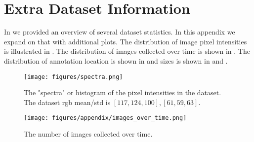 

\appendix

\section{Extra Dataset Information}

In  we provided an overview of several dataset statistics.
In this appendix we expand on that with additional plots.
The distribution of image pixel intensities is illustrated in .
The distribution of images collected over time is shown in .
The distribution of annotation location is shown in  and sizes is shown
  in  and .


\begin{figure}[ht]
\centering
\texttt{[image: figures/spectra.png]}
\caption[]{
    The "spectra" or histogram of the pixel intensities in the dataset. 
    The dataset rgb  mean/std is $[117, 124, 100], [61, 59, 63]$.
}
\label{fig:spectra}
\end{figure}


\begin{figure}[ht]
\centering
\texttt{[image: figures/appendix/images\_over\_time.png]}
\caption[]{
    The number of images collected over time.
}
\label{fig:images_over_time}
\end{figure}





